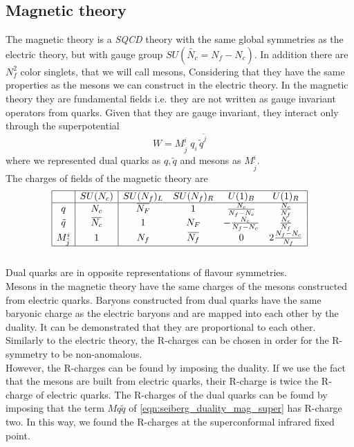 \subsection{Magnetic theory}
The magnetic theory is a \emph{SQCD} theory with the same global symmetries as the electric theory, but with gauge group $SU(\tilde{N_c} = N_f - N_c)$. 
In addition there are $N_f^2$ color singlets, that we will call mesons, Considering that they have the same properties as the mesons we can construct in the electric theory.
In the magnetic theory they are fundamental fields i.e. they are not written as gauge invariant operators from quarks. 
Given that they are gauge invariant, they interact only through the superpotential
\begin{equation}
 W  = M^i_{\tilde{j}} \; q_i \, \tilde{q}^{\tilde{j}}
 \label{eqn:seiberg_duality_mag_super}
\end{equation}
where we represented dual quarks as $q,\tilde{q}$ and mesons as $M^i_{\tilde{j}} $.\\
The charges of fields of the magnetic theory are
\begin{equation}
 \begin{array}{| c | c |  c c c c |  }
 \hline
 & SU(N_c) & SU(N_f)_L  &SU(N_f)_R   & U(1)_B &  U(1)_R \\
\hline
q & N_c & \overbar{N_F} & 1   &   \frac{N_c}{N_f-N_c}   &  \frac{N_c}{N_f}  \\
\tilde{q} &\overbar{N_c}  &  1 & { N_F}   & - \frac{N_c}{N_f-N_c}   &   \frac{N_c}{N_f}   \\	 
M^i_{\tilde{j}}  &  1  & N_f & \overbar{N_f}  & 0 &  2 \frac{N_f - N_c}{N_f}\\ 
\hline
 \end{array}
 \label{tab:sun_magnetich_charges}
\end{equation}\\
Dual quarks are in opposite representations of flavour symmetries. 
\\
Mesons in the magnetic theory have the same charges of the mesons constructed from electric quarks.
Baryons constructed from dual quarks have the same baryonic charge as the electric baryons and are mapped into each other by the duality.
It can be demonstrated that they are proportional to each other.\\
Similarly to the electric theory, the R-charges can be chosen in order for the R-symmetry to be non-anomalous.\\
However, the R-charges can be found by imposing the duality.
If we use the fact  that the mesons are built from electric quarks, their R-charge is twice the R-charge of electric quarks.
The R-charges of the dual quarks can be found by imposing that the term $M q \tilde{q}$ of \eqref{eqn:seiberg_duality_mag_super} has R-charge two.
In this way, we found the R-charges at the superconformal infrared fixed point.




